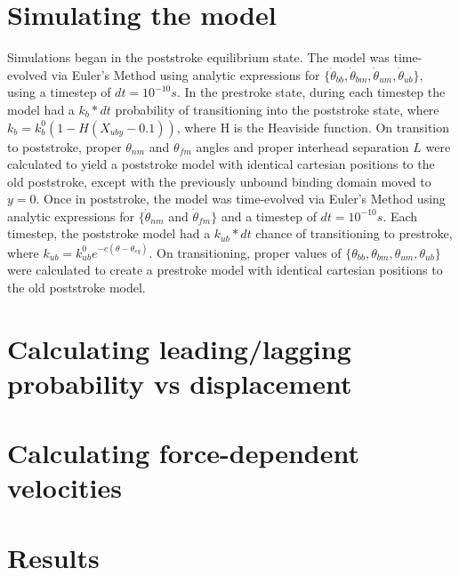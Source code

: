 \documentclass[9pt,twocolumn,twoside]{article}
\begin{document}
  \section*{Simulating the model}
  Simulations began in the poststroke equilibrium state. The model was time-evolved via Euler's Method using analytic expressions for $\{\dot{\theta}_{bb}, \dot{\theta}_{bm}, \dot{\theta}_{um}, \dot{\theta}_{ub}\}$, using a timestep of $dt = 10^{-10}s$. In the prestroke state, during each timestep the model had a $k_b*dt$ probability of transitioning into the poststroke state, where $k_b = k_b^0\left(1-H\left(X_{uby}-0.1\right)\right)$, where H is the Heaviside function. On transition to poststroke, proper $\theta_{nm}$ and $\theta_{fm}$ angles and proper interhead separation $L$ were calculated to yield a poststroke model with identical cartesian positions to the old poststroke, except with the previously unbound binding domain moved to $y=0$. Once in poststroke, the model was time-evolved via Euler's Method using analytic expressions for $\{\dot{\theta}_{nm}$ and $\dot{\theta}_{fm}\}$ and a timestep of $dt=10^{-10}s$. Each timestep, the poststroke model had a $k_{ub}*dt$ chance of transitioning to prestroke, where $k_{ub} = k^0_{ub}e^{-c(\theta-\theta_{eq})}$. On transitioning, proper values of $\{\theta_{bb}, \theta_{bm}, \theta_{um}, \theta_{ub}\}$ were calculated to create a prestroke model with identical cartesian positions to the old poststroke model.

  \section*{Calculating leading/lagging probability vs displacement}

  \section*{Calculating force-dependent velocities}


\section{Results}
\end{document}
